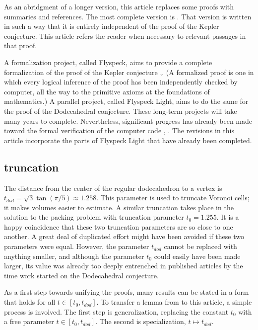 As an abridgment of a longer version, this article replaces 
some proofs with summaries and references.  The most complete version
is \cite{arx}.  That version is written in such a way that it is
entirely independent of the proof of the Kepler conjecture. 
This article refers the reader when necessary to relevant
passages in that proof.

A formalization project, called Flyspeck, aims to
provide a complete formalization of the proof of the Kepler conjecture \cite{fly},\cite{Fl}.  (A formalized proof is one in which every logical inference of the proof has been independently checked by computer, all the way to the primitive axioms at the foundations of mathematics.)
A parallel project, called Flyspeck Light, aims to do the same
for the proof of the Dodecahedral conjecture.  These long-term projects
will take many years to complete.  Nevertheless, significant progress
has already been made toward the formal verification of the computer
code \cite{BN}, \cite{Ob}.   The revisions in this article 
incorporate the parts of Flyspeck Light that have
already been completed.

\subsection{truncation}

The distance from the center of the regular dodecahedron to a vertex is
$t_{dod}=\sqrt{3}\tan(\pi/5)\approx 1.258$.   This parameter is used to truncate
Voronoi cells; it makes  volumes easier to estimate.  A similar truncation
takes place in the solution to the packing problem with truncation parameter
$t_0 = 1.255$.  It is a happy coincidence that these two truncation parameters 
are so close to one another.  
A great deal of duplicated effort
might have been avoided if these two parameters were equal.  However, the parameter
$t_{dod}$ cannot be replaced with anything smaller, 
and although the parameter $t_0$ could 
easily have been made larger, 
its value was already too deeply entrenched in published articles 
by the time  work started
on the Dodecahedral conjecture.  




 As a first step towards unifying the proofs,
 many results can be stated in a form that holds for all $t\in[t_0,t_{dod}]$.
To transfer a lemma from \cite{DCG} to this article, a simple process is
involved.  The first step is generalization, replacing the constant $t_0$
with a free parameter $t\in[t_0,t_{dod}]$.  The second is specialization,
$t\mapsto t_{dod}$.  


